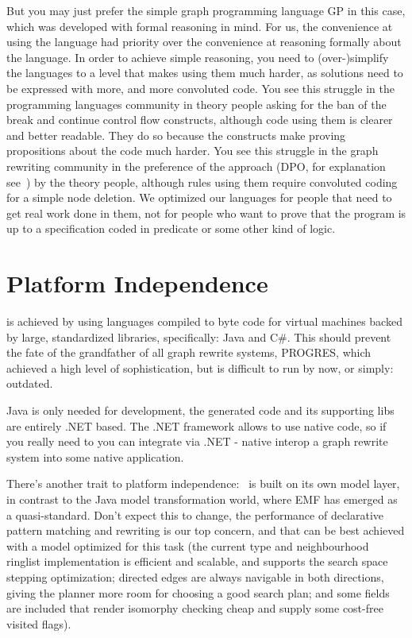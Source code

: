 But you may just prefer the simple graph programming language GP\cite{gp} in this case, which was developed with formal reasoning in mind.
For us, the convenience at using the language had priority over the convenience at reasoning formally about the language.
In order to achieve simple reasoning, you need to (over-)simplify the languages to a level that makes using them much harder, as solutions need to be expressed with more, and more convoluted code.
You see this struggle in the programming languages community in theory people asking for the ban of the break and continue control flow constructs, although code using them is clearer and better readable.
They do so because the constructs make proving propositions about the code much harder.
You see this struggle in the graph rewriting community in the preference of the  approach (DPO, for explanation see~\cite{dpoapproach}) by the theory people, although rules using them require convoluted coding for a simple node deletion.
We optimized our languages for people that need to get real work done in them, not for people who want to prove that the program is up to a specification coded in predicate or some other kind of logic. 

\section{Platform Independence}
is achieved by using languages compiled to byte code for virtual machines backed by large, standardized libraries, specifically: Java and C\#.
This should prevent the fate of the grandfather of all graph rewrite systems, PROGRES\cite{schuerr99progres},
which achieved a high level of sophistication, but is difficult to run by now, or simply: outdated.

Java is only needed for development, the generated code and its supporting libs are entirely .NET based.
The .NET framework allows to use native code, so if you really need to you can integrate via .NET - native interop a graph rewrite system into some native application.

There's another trait to platform independence: \GrG\ is built on its own model layer, in contrast to the Java model transformation world, where EMF has emerged as a quasi-standard.
Don't expect this to change, the performance of declarative pattern matching and rewriting is our top concern, and that can be best achieved with a model optimized for this task (the current type and neighbourhood ringlist implementation is efficient and scalable, and supports the search space stepping optimization; directed edges are always navigable in both directions, giving the planner more room for choosing a good search plan; and some fields are included that render isomorphy checking cheap and supply some cost-free visited flags).


